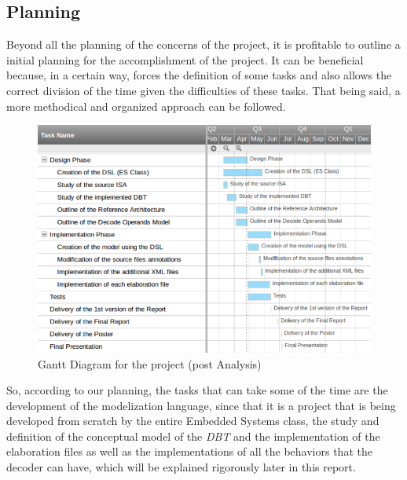 \documentclass[12pt]{article}
\begin{document}
{\begin{itemize}
\end{itemize}

\subsection{Planning}
Beyond all the planning of the concerns of the project, it is profitable to outline a initial planning for the accomplishment of the project. It can be beneficial because, in a certain way, forces the definition of some tasks and also allows the correct division of the time given the difficulties of these tasks. That being said, a more methodical and organized approach can be followed.


\begin{figure}[!hb]
\centerline{
\includegraphics[scale=0.6]{images/planning}}
\caption{Gantt Diagram for the project (post Analysis)}
\label{fig:planning} 
\end{figure}

So, according to our planning, the tasks that can take some of the time are the development of the modelization language, since that it is a project that is being developed from scratch by the entire Embedded Systems class, the study and definition of the conceptual model of the \textit{DBT} and the implementation of the elaboration files as well as the implementations of all the behaviors that the decoder can have, which will be explained rigorously later in this report. 









}
\end{document}
